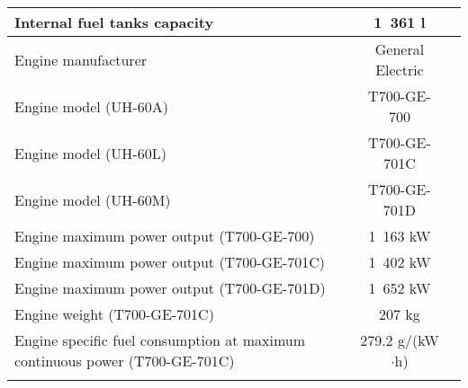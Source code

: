 \begin{tabularx}{\textwidth}{ | L | c | c | }
  Internal fuel tanks capacity          & 1~361 l          & \cite{Janes20042005,UH60_OperatorsManual} \\ \hline
  Engine manufacturer                   & General Electric & \cite{Janes20042005} \\ \hline
  Engine model (UH-60A)                 & T700-GE-700      & \cite{Janes20042005,UH60_OperatorsManual} \\ \hline
  Engine model (UH-60L)                 & T700-GE-701C     & \cite{Janes20042005,UH60_OperatorsManual} \\ \hline
  Engine model (UH-60M)                 & T700-GE-701D     & \cite{Janes20042005} \\ \hline
  Engine maximum power output (T700-GE-700)  & 1~163 kW    & \cite{Janes20042005} \\ \hline
  Engine maximum power output (T700-GE-701C) & 1~402 kW    & \cite{Janes20042005} \\ \hline
  Engine maximum power output (T700-GE-701D) & 1~652 kW    & \cite{Janes20042005} \\ \hline
  Engine weight (T700-GE-701C)          & 207 kg           & \cite{UH60_GE_T700_DataSheet} \\ \hline
  Engine specific fuel consumption at maximum continuous power (T700-GE-701C) & 279.2 g/(kW$\cdot$h) & \cite{UH60_GE_T700_DataSheet} \\ \hline
  \caption{Basic data}
\end{tabularx}
